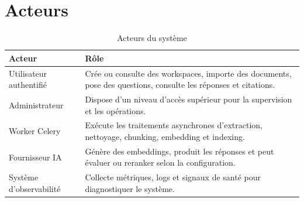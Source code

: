 \documentclass[12pt,a4paper,oneside]{report}
\begin{document}
\section{Acteurs}
\begin{table}[H]
  \centering
  \caption{Acteurs du système}
  \begin{tabularx}{\textwidth}{L{3cm}Y}
    \toprule
    \textbf{Acteur} & \textbf{Rôle} \\
    \midrule
    Utilisateur authentifié & Crée ou consulte des workspaces, importe des documents, pose des questions, consulte les réponses et citations. \\
    Administrateur & Dispose d'un niveau d'accès supérieur pour la supervision et les opérations. \\
    Worker Celery & Exécute les traitements asynchrones d'extraction, nettoyage, chunking, embedding et indexing. \\
    Fournisseur IA & Génère des embeddings, produit les réponses et peut évaluer ou reranker selon la configuration. \\
    Système d'observabilité & Collecte métriques, logs et signaux de santé pour diagnostiquer le système. \\
    \bottomrule
  \end{tabularx}
\end{table}
\end{document}
